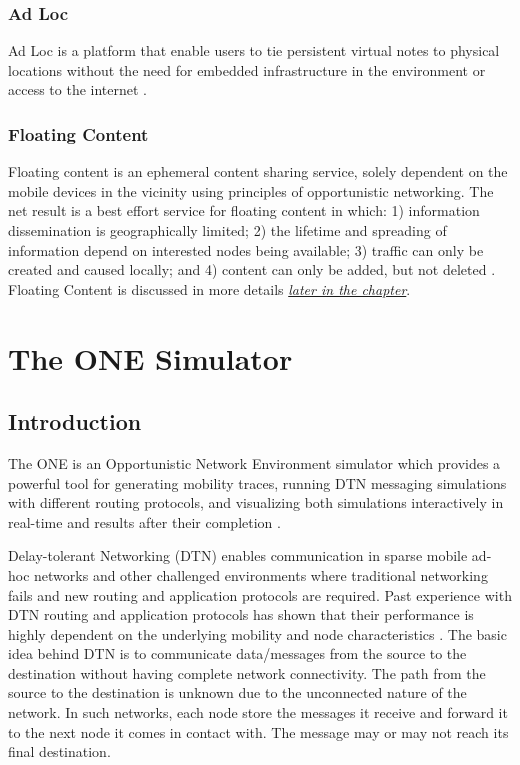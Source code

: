 \subsubsection{Ad Loc} 
Ad Loc is a platform that enable users to tie persistent virtual notes to physical locations without the need for embedded infrastructure in the environment or access to the internet \cite{Corbett2006ADL}.
\subsubsection {Floating Content}
Floating content is an ephemeral content sharing service, solely dependent on the mobile devices in the vicinity using principles of opportunistic networking. The net result is a best effort service for floating content in which: 1) information dissemination is geographically limited; 2) the lifetime and spreading of information depend on interested nodes being available; 3) traffic can only be created and caused locally; and 4) content can only be added, but not deleted \cite{floating-content}. Floating Content is discussed in more details \hyperref[section:floating-content]{\emph{later in the chapter}}.

\newpage
\section{The ONE Simulator}
\subsection{Introduction}
The ONE is an Opportunistic Network Environment simulator \cite{the-one} which provides a powerful tool for generating mobility traces, running DTN messaging simulations with different routing protocols, and visualizing both simulations interactively in real-time and results after their completion \cite{the-one-ari}.

Delay-tolerant Networking (DTN) enables communication in sparse mobile ad-hoc networks and other challenged environments where traditional networking fails and new routing and application protocols are required. Past experience with DTN routing and application protocols has shown that their performance is highly dependent on the underlying mobility and node characteristics \cite{keranen-theone}. The basic idea behind DTN is to communicate data/messages from the source to the destination without having complete network connectivity. The path from the source to the destination is unknown due to the unconnected nature of the network. In such networks, each node store the messages it receive and forward it to the next node it comes in contact with. The message may or may not reach its final destination.

